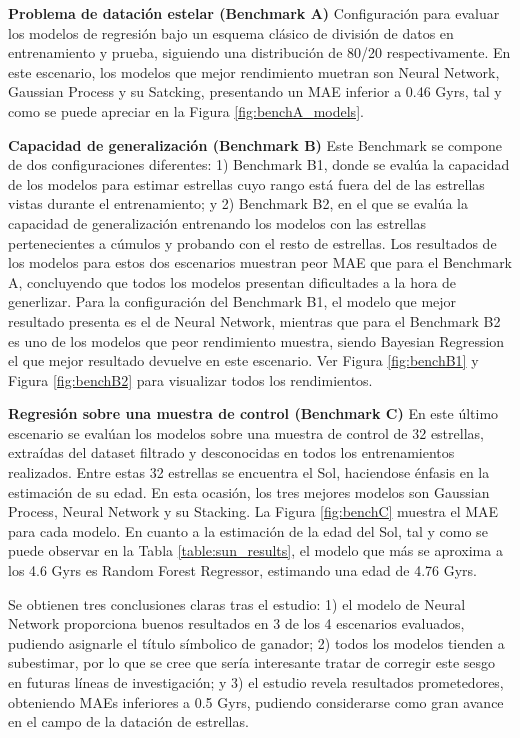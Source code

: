 \textbf{Problema de datación estelar (Benchmark A)} {} Configuración para evaluar los modelos de regresión bajo un esquema clásico de división de datos en entrenamiento y prueba, siguiendo una distribución de 80/20 respectivamente. En este escenario, los modelos que mejor rendimiento muetran son Neural Network, Gaussian Process y su Satcking, presentando un MAE inferior a 0.46 Gyrs, tal y como se puede apreciar en la Figura \ref{fig:benchA_models}.

\vspace{0.25cm}

\textbf{Capacidad de generalización (Benchmark B)} {} Este Benchmark se compone de dos configuraciones diferentes: 1) Benchmark B1, donde se evalúa la capacidad de los modelos para estimar estrellas cuyo rango está fuera del de las estrellas vistas durante el entrenamiento; y 2) Benchmark B2, en el que se evalúa la capacidad de generalización entrenando los modelos con las estrellas pertenecientes a cúmulos y probando con el resto de estrellas. Los resultados de los modelos para estos dos escenarios muestran peor MAE que para el Benchmark A, concluyendo que todos los modelos presentan dificultades a la hora de generlizar. Para la configuración del Benchmark B1, el modelo que mejor resultado presenta es el de Neural Network, mientras que para el Benchmark B2 es uno de los modelos que peor rendimiento muestra, siendo Bayesian Regression el que mejor resultado devuelve en este escenario. Ver Figura \ref{fig:benchB1} y Figura \ref{fig:benchB2} para visualizar todos los rendimientos.

\vspace{0.25cm}

\textbf{Regresión sobre una muestra de control (Benchmark C)} {} En este último escenario se evalúan los modelos sobre una muestra de control de 32 estrellas, extraídas del dataset filtrado y desconocidas en todos los entrenamientos realizados. Entre estas 32 estrellas se encuentra el Sol, haciendose énfasis en la estimación de su edad. En esta ocasión, los tres mejores modelos son Gaussian Process, Neural Network y su Stacking. La Figura \ref{fig:benchC} muestra el MAE para cada modelo. En cuanto a la estimación de la edad del Sol, tal y como se puede observar en la Tabla \ref{table:sun_results}, el modelo que más se aproxima a los 4.6 Gyrs es Random Forest Regressor, estimando una edad de 4.76 Gyrs.

\vspace{0.5cm}

Se obtienen tres conclusiones claras tras el estudio: 1) el modelo de Neural Network proporciona buenos resultados en 3 de los 4 escenarios evaluados, pudiendo asignarle el título símbolico de ganador; 2) todos los modelos tienden a subestimar, por lo que se cree que sería interesante tratar de corregir este sesgo en futuras líneas de investigación; y 3) el estudio revela resultados prometedores, obteniendo MAEs inferiores a 0.5 Gyrs, pudiendo considerarse como gran avance en el campo de la datación de estrellas.


